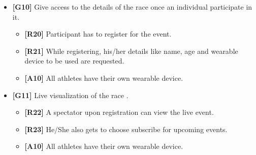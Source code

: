 \begin{itemize}
\item\textbf{[G10]} Give access to the details of the race once an individual participate in it.

\begin{itemize}
\item\textbf{[R20]} Participant has to register for the event.
\item\textbf{[R21]} While registering, his/her details like name, age and wearable device to be used are requested.
\item\textbf{[A10]} All athletes have their own wearable device.\newline
\end{itemize}

\item\textbf{[G11]} Live visualization of the race .

\begin{itemize}
\item\textbf{[R22]} A spectator upon registration can view the live event.
\item\textbf{[R23]} He/She also gets to choose subscribe for upcoming events.
\item\textbf{[A10]} All athletes have their own wearable device.\newline
\end{itemize}

\end{itemize}
